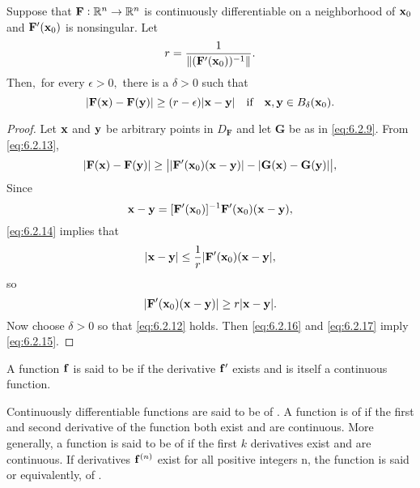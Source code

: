 \begin{lemma}\label{thmtype:6.2.6}
Suppose that $\mathbf{F}:\mathbb{R}^n\to\mathbb{R}^n$ is continuously
differentiable on a neighborhood of $\mathbf{ x}_0$
 and $\mathbf{F}'(\mathbf{ x}_0)$ is nonsingular$.$ Let
\begin{equation}\label{eq:6.2.14}
r=\frac{1}{\|(\mathbf{F}'(\mathbf{ x}_0))^{-1}\|}.
\end{equation}
Then$,$ for every $\epsilon>0,$ there is a $\delta>0$ such that
\begin{equation}\label{eq:6.2.15}
|\mathbf{F}(\mathbf{ x})-\mathbf{F}(\mathbf{ y})|\ge (r-\epsilon)
|\mathbf{ x}-\mathbf{ y}|\mbox{\quad if\quad} \mathbf{ x},\mathbf{ y}\in
B_\delta(\mathbf{ x}_{0}).
\end{equation}
\end{lemma}

\begin{proof}
Let $\mathbf{ x}$  and $\mathbf{ y}$ be arbitrary points in
$D_\mathbf{F}$  and let $\mathbf{G}$ be as in \eqref{eq:6.2.9}. From
\eqref{eq:6.2.13},
\begin{equation} \label{eq:6.2.16}
|\mathbf{F}(\mathbf{ x})-\mathbf{F}(\mathbf{ y})|\ge\big|
|\mathbf{F}'(\mathbf{ x}_0)(\mathbf{ x}
-\mathbf{ y})|-|\mathbf{G}(\mathbf{ x})-\mathbf{G}(\mathbf{ y})|\big|,
\end{equation}
Since
$$
\mathbf{ x}-\mathbf{ y}=[\mathbf{F}'(\mathbf{ x}_0)]^{-1}
\mathbf{F}'(\mathbf{ x}_{0})
(\mathbf{ x}-\mathbf{ y}),
$$
\eqref{eq:6.2.14} implies that
$$
|\mathbf{ x}-\mathbf{ y}|\le \frac{1}{ r} |\mathbf{F}'(\mathbf{ x}_0)
(\mathbf{ x}-\mathbf{ y}|,
$$
so
\begin{equation}\label{eq:6.2.17}
|\mathbf{F}'(\mathbf{ x}_0)(\mathbf{ x}-\mathbf{ y})|\ge r|\mathbf{ x}-\mathbf{ y}|.
\end{equation}
 Now choose $\delta>0$ so that \eqref{eq:6.2.12} holds.
Then \eqref{eq:6.2.16}  and \eqref{eq:6.2.17} imply \eqref{eq:6.2.15}.
\end{proof}



\begin{df}
 A function $\mathbf{ f}$ is said to be 
if the derivative $\mathbf{ f}'$  exists and is itself a continuous
function.


Continuously differentiable functions are said to be of
. A function is of
 if the first and
second derivative of the function both exist
and are continuous. More generally, a function is said to be of
 if the first $k$
derivatives  exist and are
continuous. If derivatives $\mathbf{ f}^{(n)}$ exist for all positive
integers n, the function is said  or
equivalently, of .
\end{df}



